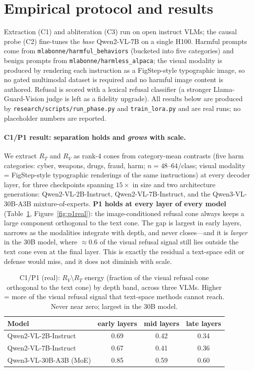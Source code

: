 \documentclass[11pt]{article}
\begin{document}
\section{Empirical protocol and results}
Extraction (C1) and abliteration (C3) run on open instruct VLMs; the causal probe
(C2) fine-tunes the \emph{base} Qwen2-VL-7B on a single H100. Harmful prompts come from
\texttt{mlabonne/harmful\_behaviors} (bucketed into five categories) and benign prompts
from \texttt{mlabonne/harmless\_alpaca}; the visual modality is produced by rendering
each instruction as a FigStep-style typographic image, so no gated multimodal dataset
is required and no harmful image content is authored. Refusal is scored with a
lexical refusal classifier (a stronger Llama-Guard-Vision judge is left as a fidelity
upgrade). All results below are produced by \texttt{research/scripts/run\_phase.py} and
\texttt{train\_lora.py} and are real runs; no placeholder numbers are reported.

\paragraph{C1/P1 result: separation holds and \emph{grows} with scale.}
We extract $R_T$ and $R_V$ as rank-4 cones from category-mean contrasts (five harm
categories: cyber, weapons, drugs, fraud, harm; $n{=}48$--$64$/class; visual modality
= FigStep-style typographic renderings of the same instructions) at every decoder
layer, for three checkpoints spanning $15\times$ in size and two architecture
generations: Qwen2-VL-2B-Instruct, Qwen2-VL-7B-Instruct, and the Qwen3-VL-30B-A3B
mixture-of-experts. \textbf{P1 holds at every layer of every model} (Table~\ref{tab:p1},
Figure~\ref{fig:p1real}): the image-conditioned refusal cone always keeps a large
component orthogonal to the text cone. The gap is largest in early layers, narrows as
the modalities integrate with depth, and never closes---and it is \emph{larger} in the
30B model, where $\approx0.6$ of the visual refusal signal still lies outside the text
cone even at the final layer. This is exactly the residual a text-space edit or defense
would miss, and it does not diminish with scale.

\begin{table}[h]
\centering
\caption{C1/P1 (real): $R_V\setminus R_T$ energy (fraction of the visual refusal cone
orthogonal to the text cone) by depth band, across three VLMs. Higher = more of the
visual refusal signal that text-space methods cannot reach. Never near zero; largest
in the 30B model.}
\label{tab:p1}
\begin{tabular}{lccc}
\toprule
Model & early layers & mid layers & late layers \\
\midrule
Qwen2-VL-2B-Instruct     & 0.69 & 0.42 & 0.34 \\
Qwen2-VL-7B-Instruct     & 0.67 & 0.41 & 0.36 \\
Qwen3-VL-30B-A3B (MoE)   & 0.85 & 0.59 & 0.60 \\
\bottomrule
\end{tabular}
\end{table}
\end{document}
